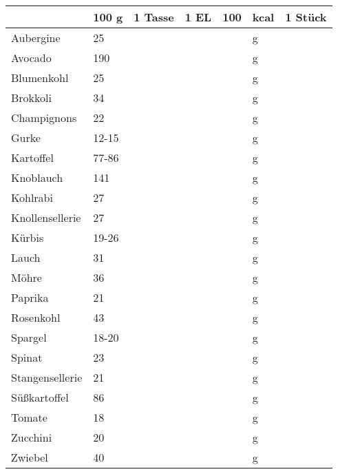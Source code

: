 \begin{tabularx}{\linewidth}{X|l|r|r|rl|r}
                  &   100 g & 1 Tasse & 1 EL &      100 & kcal    & 1 Stück  \\
\hline
Aubergine         &      25 &         &      &          & g       &          \\
Avocado           &     190 &         &      &          & g       &          \\
Blumenkohl        &      25 &         &      &          & g       &          \\
Brokkoli          &      34 &         &      &          & g       &          \\
Champignons       &      22 &         &      &          & g       &          \\
Gurke             &   12-15 &         &      &          & g       &          \\
Kartoffel         &   77-86 &         &      &          & g       &          \\
Knoblauch         &     141 &         &      &          & g       &          \\
Kohlrabi          &      27 &         &      &          & g       &          \\
Knollensellerie   &      27 &         &      &          & g       &          \\
Kürbis            &   19-26 &         &      &          & g       &          \\
Lauch             &      31 &         &      &          & g       &          \\
Möhre             &      36 &         &      &          & g       &          \\
Paprika           &      21 &         &      &          & g       &          \\
Rosenkohl         &      43 &         &      &          & g       &          \\
Spargel           &   18-20 &         &      &          & g       &          \\
Spinat            &      23 &         &      &          & g       &          \\
Stangensellerie   &      21 &         &      &          & g       &          \\
Süßkartoffel      &      86 &         &      &          & g       &          \\
Tomate            &      18 &         &      &          & g       &          \\
Zucchini          &      20 &         &      &          & g       &          \\
Zwiebel           &      40 &         &      &          & g       &          \\
\end{tabularx}
